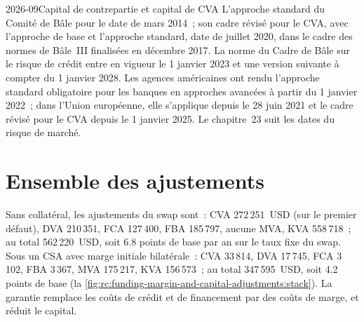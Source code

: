 \begin{dated}{2026-09}{Capital de contrepartie et capital de CVA}\label{dat:rc:funding-margin-and-capital-adjustments:capital}
L'approche standard du Comité de Bâle pour le  date de mars
2014~; son cadre révisé pour le CVA, avec l'approche de base et l'approche standard, date de juillet 2020,
dans le cadre des normes de Bâle~III finalisées en décembre 2017. La norme du Cadre de Bâle sur le risque de crédit
entre en vigueur le 1 janvier 2023 et une version suivante à compter du 1 janvier
2028. Les agences américaines ont rendu l'approche standard obligatoire pour les banques en approches avancées à partir du
1 janvier 2022~; dans l'Union européenne, elle s'applique depuis le 28 juin 2021 et le cadre révisé pour le CVA depuis
le 1 janvier 2025. Le chapitre~23 suit les dates du risque de marché.
\end{dated}

\section{Ensemble des ajustements}

\begin{example}\label{ex:rc:funding-margin-and-capital-adjustments:stack}
Sans collatéral, les ajustements du swap sont~: CVA 272\,251~USD (sur le premier défaut), DVA
210\,351, FCA 127\,400, FBA 185\,797, aucune MVA, KVA 558\,718~; au total 562\,220~USD, soit 6.8
points de base par an sur le taux fixe du swap. Sous un CSA avec marge initiale bilatérale~: CVA 33\,814,
DVA 17\,745, FCA 3\,102, FBA 3\,367, MVA 175\,217, KVA 156\,573~; au total 347\,595~USD, soit 4.2
points de base (la \cref{fig:rc:funding-margin-and-capital-adjustments:stack}). La garantie remplace les coûts de crédit et de financement par des coûts de marge,
et réduit le capital.
\end{example}

